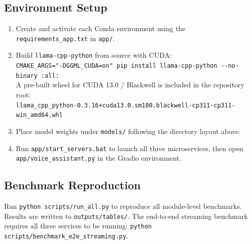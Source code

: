 \documentclass[12pt, a4paper]{article}
\begin{document}
\subsection*{Environment Setup}
\begin{enumerate}
  \item Create and activate each Conda environment using the \texttt{requirements\_app.txt} in \texttt{app/}.
  \item Build \texttt{llama-cpp-python} from source with CUDA:\\
        \texttt{CMAKE\_ARGS="-DGGML\_CUDA=on" pip install llama-cpp-python -{}-no-binary :all:}\\
        A pre-built wheel for CUDA 13.0 / Blackwell is included in the repository root:\\
        \texttt{llama\_cpp\_python-0.3.16+cuda13.0.sm100.blackwell-cp311-cp311-win\_amd64.whl}
  \item Place model weights under \texttt{models/} following the directory layout above.
  \item Run \texttt{app/start\_servers.bat} to launch all three microservices, then open \texttt{app/voice\_assistant.py} in the Gradio environment.
\end{enumerate}

\subsection*{Benchmark Reproduction}
Run \texttt{python scripts/run\_all.py} to reproduce all module-level benchmarks. Results are written to \texttt{outputs/tables/}. The end-to-end streaming benchmark requires all three services to be running: \texttt{python scripts/benchmark\_e2e\_streaming.py}.



\end{document}
